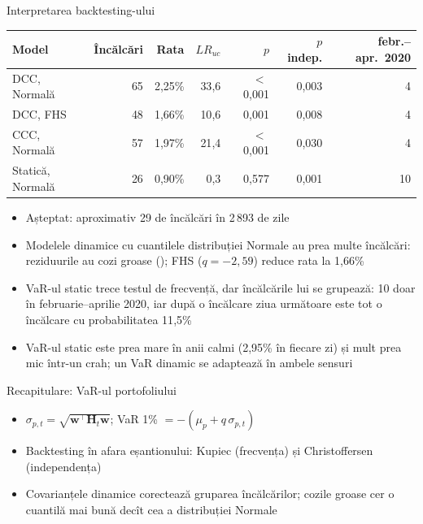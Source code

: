 \begin{frame}{Interpretarea backtesting-ului}
\itemsize{\footnotesize}
\begin{center}
\footnotesize
\begin{tabular}{lrrrrrr}
\toprule
\textbf{Model} & Încălcări & Rata & $LR_{uc}$ & $p$ & $p$ indep. & febr.--apr.\ 2020 \\
\midrule
DCC, Normală & 65 & 2{,}25\% & 33{,}6 & $<$\,0{,}001 & 0{,}003 & 4 \\
DCC, FHS & 48 & 1{,}66\% & 10{,}6 & 0{,}001 & 0{,}008 & 4 \\
CCC, Normală & 57 & 1{,}97\% & 21{,}4 & $<$\,0{,}001 & 0{,}030 & 4 \\
Statică, Normală & 26 & 0{,}90\% & 0{,}3 & 0{,}577 & 0{,}001 & 10 \\
\bottomrule
\end{tabular}
\end{center}
\begin{itemize}
    \item Așteptat: aproximativ 29 de încălcări în 2\,893 de zile
    \item Modelele dinamice cu cuantilele distribuției Normale au prea multe încălcări: reziduurile au cozi groase (); FHS ($q = -2{,}59$) reduce rata la 1{,}66\%
    \item VaR-ul static trece testul de frecvență, dar încălcările lui se grupează: 10 doar în februarie--aprilie 2020, iar după o încălcare ziua următoare este tot o încălcare cu probabilitatea 11{,}5\%
    \item VaR-ul static este prea mare în anii calmi (2{,}95\% în fiecare zi) și mult prea mic într-un crah; un VaR dinamic se adaptează în ambele sensuri
\end{itemize}
\end{frame}

\begin{frame}{Recapitulare: VaR-ul portofoliului}
\itemsize{\small}
\begin{itemize}
    \item $\sigma_{p,t} = \sqrt{\mathbf{w}^\top\mathbf{H}_t\mathbf{w}}$; VaR 1\% $= -(\mu_p + q\,\sigma_{p,t})$
    \item Backtesting în afara eșantionului: Kupiec (frecvența) și Christoffersen (independența)
    \item Covarianțele dinamice corectează gruparea încălcărilor; cozile groase cer o cuantilă mai bună decît cea a distribuției Normale
\end{itemize}
\end{frame}


